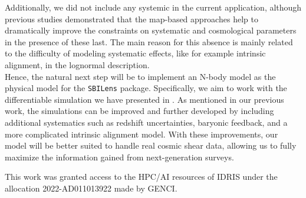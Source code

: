 \documentclass{aa}
\begin{document}
Additionally, we did not include any systemic in the current application, although previous studies demonstrated that the map-based approaches help to dramatically improve the constraints on systematic and cosmological parameters in the presence of these last. The main reason for this absence is mainly related to the difficulty of modeling systematic effects, like for example intrinsic alignment, in the lognormal description. \\
Hence, the natural next step will be to implement an N-body model as the physical model for the \texttt{SBILens} package. 
Specifically, we aim to work with the differentiable simulation we have presented in \citet{}. As mentioned in our previous work, the simulations can be improved and further developed by including additional systematics such as redshift uncertainties, baryonic feedback, and a more complicated intrinsic alignment model.
With these improvements, our model will be better suited to handle real cosmic shear data, allowing us to fully maximize the information gained from next-generation surveys. 
 
\begin{acknowledgements}
This work was granted access to the HPC/AI resources of IDRIS under the allocation 2022-AD011013922 made by GENCI.
\end{acknowledgements}
 
\end{document}
